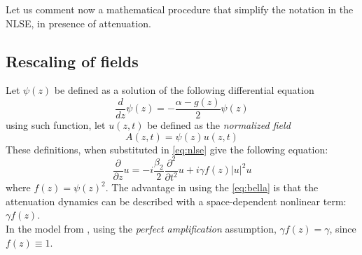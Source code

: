 \documentclass[10pt, lettersize, journal, onecolumn]{IEEEtran}
\begin{document}
   Let us comment now a mathematical procedure that simplify the notation in the NLSE, in presence of attenuation.
\subsection{Rescaling of fields}\label{ss:rescaling}
Let $\psi(z)$ be defined as a solution of the following differential equation
\begin{equation}
 \frac{d}{dz}\psi(z) = -\frac{\alpha-g(z)}{2} \psi(z)
\end{equation}
using such function, let $u(z, t)$ be defined as the \textit{normalized field}
\begin{equation}
 A(z, t) = \psi(z)u(z, t)
\end{equation}
These definitions, when substituted in \ref{eq:nlse} give the following equation:
\begin{equation}\label{eq:bella}
 \frac{\partial}{\partial z} u = - i \frac{\beta_2}{2} \frac{\partial^2}{\partial t^2} u + i \gamma f(z) |u|^2 u
\end{equation}
where $f(z) = \psi(z)^2$. The advantage in using the \ref{eq:bella} is that the attenuation dynamics can be described with a space-dependent nonlinear term: $\gamma f(z)$. \\
In the model from \cite{Dar_2013}, using the \textit{perfect amplification} assumption, $\gamma f(z) = \gamma$, since $f(z) \equiv 1$.

\end{document}

